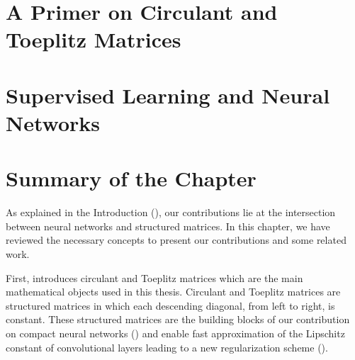 \section{A Primer on Circulant and Toeplitz Matrices}
\label{section:ch2-a_primer_on_circulant_and_toeplitz_matrices}



\section{Supervised Learning and Neural Networks}
\label{section:ch2-supervised_learning_neural_networks}



\section{Summary of the Chapter}
\label{section:ch2-summary_of_the_background}

As explained in the Introduction (), our contributions lie at the intersection between neural networks and structured matrices.
In this chapter, we have reviewed the necessary concepts to present our contributions and some related work.

First,  introduces circulant and Toeplitz matrices which are the main mathematical objects used in this thesis.
Circulant and Toeplitz matrices are structured matrices in which each descending diagonal, from left to right, is constant.
These structured matrices are the building blocks of our contribution on compact neural networks () and enable fast approximation of the Lipschitz constant of convolutional layers leading to a new regularization scheme ().

